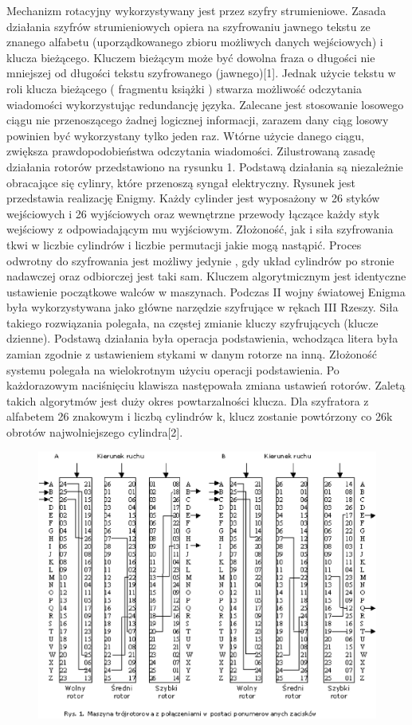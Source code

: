 \documentclass[11pt,a4paper,polish]{article}
\begin{document}
Mechanizm rotacyjny wykorzystywany jest przez szyfry strumieniowe. Zasada
działania szyfrów strumieniowych opiera na szyfrowaniu jawnego tekstu ze 
znanego alfabetu (uporządkowanego zbioru możliwych danych wejściowych) i klucza
bieżącego. Kluczem bieżącym może być dowolna fraza o długości nie mniejszej
od długości tekstu szyfrowanego (jawnego)[1]. Jednak użycie tekstu w roli klucza bieżącego ( fragmentu książki ) stwarza możliwość odczytania wiadomości
wykorzystując redundancję języka. Zalecane jest stosowanie losowego ciągu nie
przenoszącego żadnej logicznej informacji, zarazem dany ciąg losowy powinien
być wykorzystany tylko jeden raz. Wtórne użycie danego ciągu, zwiększa prawdopodobieństwa odczytania wiadomości.
Zilustrowaną zasadę działania rotorów przedstawiono na rysunku 1. Podstawą
działania są niezależnie obracające się cylinry, które przenoszą syngał elektryczny. Rysunek jest przedstawia realizację Enigmy. Każdy cylinder jest wyposażony
w 26 styków wejściowych i 26 wyjściowych oraz wewnętrzne przewody łączące
każdy styk wejściowy z odpowiadającym mu wyjściowym. Złożoność, jak i siła
szyfrowania tkwi w liczbie cylindrów i liczbie permutacji jakie mogą nastąpić.
Proces odwrotny do szyfrowania jest możliwy jedynie , gdy układ cylindrów
po stronie nadawczej oraz odbiorczej jest taki sam. Kluczem algorytmicznym
jest identyczne ustawienie początkowe walców w maszynach. Podczas II wojny światowej Enigma była wykorzystywana jako główne narzędzie szyfrujące w
rękach III Rzeszy. Siła takiego rozwiązania polegała, na częstej zmianie kluczy
szyfrujących (klucze dzienne). Podstawą działania była operacja podstawienia,
wchodząca litera była zamian zgodnie z ustawieniem stykami w danym rotorze
na inną. Złożoność systemu polegała na wielokrotnym użyciu operacji podstawienia. Po każdorazowym naciśnięciu klawisza następowała zmiana ustawień
rotorów.
Zaletą takich algorytmów jest duży okres powtarzalności klucza. Dla szyfratora
z alfabetem 26 znakowym i liczbą cylindrów k, klucz zostanie powtórzony co
26k obrotów najwolniejszego cylindra[2].
\begin{figure}
\includegraphics[scale=0.8]{rotors.eps}
\end{figure}
\end{document}
